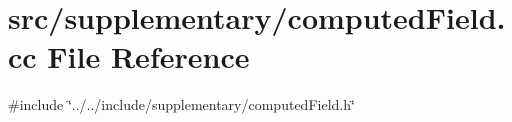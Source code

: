 \section{src/supplementary/computed\+Field.cc File Reference}
\label{computed_field_8cc}
{\ttfamily \#include \char`\"{}../../include/supplementary/computed\+Field.\+h\char`\"{}}\newline

